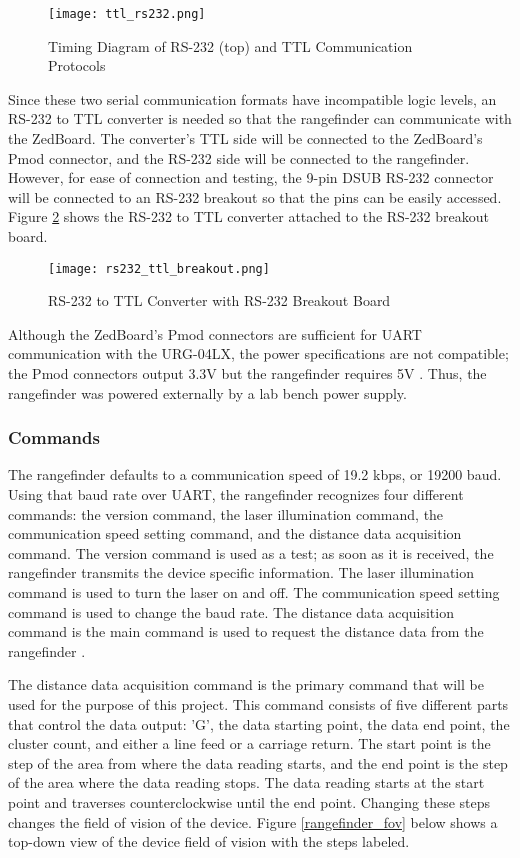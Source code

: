 \begin{figure}[H]
	\centerline{\texttt{[image: ttl\_rs232.png]}}
	\caption{Timing Diagram of RS-232 (top) and TTL Communication Protocols \cite{ttl}}
	\label{ttl_rs232_pic}
\end{figure}

Since these two serial communication formats have incompatible logic levels, an RS-232 to TTL converter is needed so that the rangefinder can communicate with the ZedBoard. The converter's TTL side will be connected to the ZedBoard's Pmod connector, and the RS-232 side will be connected to the rangefinder. However, for ease of connection and testing, the 9-pin DSUB RS-232 connector will be connected to an RS-232 breakout so that the pins can be easily accessed. Figure \ref{rs232_ttl_breakout} shows the RS-232 to TTL converter attached to the RS-232 breakout board.

\begin{figure}[H]
	\centerline{\texttt{[image: rs232\_ttl\_breakout.png]}}
	\caption{RS-232 to TTL Converter with RS-232 Breakout Board}
	\label{rs232_ttl_breakout}
\end{figure}

Although the ZedBoard's Pmod connectors are sufficient for UART communication with the URG-04LX, the power specifications are not compatible; the Pmod connectors output 3.3V but the rangefinder requires 5V \cite{zedboard_datasheet, urg04lx_specifications}. Thus, the rangefinder was powered externally by a lab bench power supply.

\subsubsection{Commands}
The rangefinder defaults to a communication speed of 19.2 kbps, or 19200 baud. Using that baud rate over UART, the rangefinder recognizes four different commands: the version command, the laser illumination command, the communication speed setting command, and the distance data acquisition command. The version command is used as a test; as soon as it is received, the rangefinder transmits the device specific information. The laser illumination command is used to turn the laser on and off. The communication speed setting command is used to change the baud rate. The distance data acquisition command is the main command is used to request the distance data from the rangefinder \cite{urg04lx_datasheet}.
\par
The distance data acquisition command is the primary command that will be used for the purpose of this project. This command consists of five different parts that control the data output: 'G', the data starting point, the data end point, the cluster count, and either a line feed or a carriage return. The start point is the step of the area from where the data reading starts, and the end point is the step of the area where the data reading stops. The data reading starts at the start point and traverses counterclockwise until the end point. Changing these steps changes the field of vision of the device. Figure \ref{rangefinder_fov} below shows a top-down view of the device field of vision with the steps labeled.

